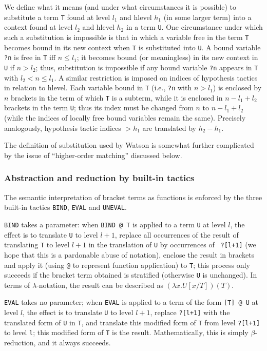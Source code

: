 \documentclass{kluwer}
\begin{document}
\begin{article}
We define what it means (and under what circumstances it is possible)
to substitute a term {\tt T} found at level $l_1$ and hlevel $h_1$ (in
some larger term) into a context found at level $l_2$ and hlevel $h_2$
in a term {\tt U}.  One circumstance under which such a substitution is
impossible is that in which a variable free in the term {\tt T} becomes
bound in its new context when {\tt T} is substituted into {\tt U}.  A bound
variable {\tt ?n} is free in {\tt T} iff $n \leq l_1$; it becomes bound
(or meaningless) in its new context in {\tt U} if $n > l_2$; thus,
substitution is impossible if any bound variable {\tt ?n} appears in
{\tt T} with $l_2 < n \leq l_1$.  A similar restriction is imposed on
indices of hypothesis tactics in relation to hlevel.  Each variable
bound in {\tt T} (i.e., {\tt ?n} with $n > l_1$) is enclosed by $n$
brackets in the term of which {\tt T} is a subterm, while it is enclosed
in $n-l_1+l_2$ brackets in the term {\tt U}; thus its index must be
changed from $n$ to $n-l_1+l_2$ (while the indices of locally free
bound variables remain the same).  Precisely analogously, hypothesis
tactic indices $>h_1$ are translated by $h_2-h_1$.

The definition of substitution used by Watson is somewhat further
complicated by the issue of ``higher-order matching'' discussed below.

\subsubsection{ Abstraction and reduction by built-in tactics }

The semantic interpretation of bracket terms as functions is enforced
by the three built-in tactics {\tt BIND}, {\tt EVAL} and {\tt UNEVAL}.

{\tt BIND\/} takes a parameter: when {\tt BIND @ T} is applied to a
term {\tt U} at level $l$, the effect is to translate {\tt U} to level
$l+1$, replace all occurrences of the result of translating {\tt T} to
level $l+1$ in the translation of {\tt U} by occurrences of {\tt
?[l+1]} (we hope that this is a pardonable abuse of notation),
enclose the result in brackets and apply it (using {\tt @} to
represent function application) to {\tt T}; this process only succeeds
if the bracket term obtained is stratified (otherwise {\tt U} is
unchanged). In terms of $\lambda$-notation, the result can be
described as $(\lambda x.U[x/T])(T)$.

{\tt EVAL} takes no parameter; when {\tt EVAL} is applied to a term of
the form {\tt [T] @ U} at level $l$, the effect is to translate {\tt U} to
level $l+1$, replace {\tt ?[l+1]} with the translated form of {\tt U}
in {\tt T}, and translate this modified form of {\tt T} from level
{\tt ?[l+1]} to level {\tt l}; this modified form of {\tt T} is the
result.  Mathematically, this is simply $\beta$-reduction, and it
always succeeds.


\end{article}
\end{document}
